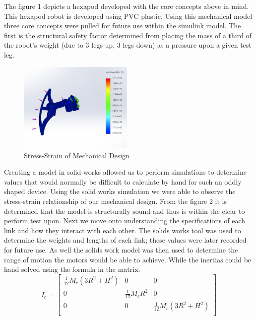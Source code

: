 The figure 1 depicts a hexapod developed with the core concepts above in mind. This hexapod robot is developed using PVC plastic. Using this mechanical model three core concepts were pulled for future use within the simulink model. The first is the structural safety factor determined from placing the mass of a third of the robot's weight (due to 3 legs up, 3 legs down) as a pressure upon a given test leg. 

\begin{figure}[h]
 \centering
   \includegraphics[width = 0.49\textwidth]{figures/4.png}                \caption{Stress-Strain of Mechanical Design}
   \label{fig:Stress-Strain of Mechanical Design}
\end{figure}

Creating a model in solid works allowed us to perform simulations to determine values that would normally be difficult to calculate by hand for such an oddly shaped device. Using the solid works simulation we were able to observe the stress-strain relationship of our mechanical design.
From the figure 2 it is determined that the model is structurally sound and thus is within the clear to perform test upon. Next we move onto understanding the specifications of each link and how they interact with each other. The solids works tool was used to determine the weights and lengths of each link; these values were later recorded for future use. As well the solids work model was then used to determine the range of motion the motors would be able to achieve. While the inertias could be hand solved using the formula in the matrix.\\

\begin{equation*}
I_c = 
\begin{bmatrix}
\frac{1}{12} M_c (3R^2+H^2) & 0 & 0\\
0 & \frac{1}{12} M_c R^2 & 0\\
0 & 0 & \frac{1}{12} M_c (3R^2+H^2)\\

\end{bmatrix}
\end{equation*}\\

